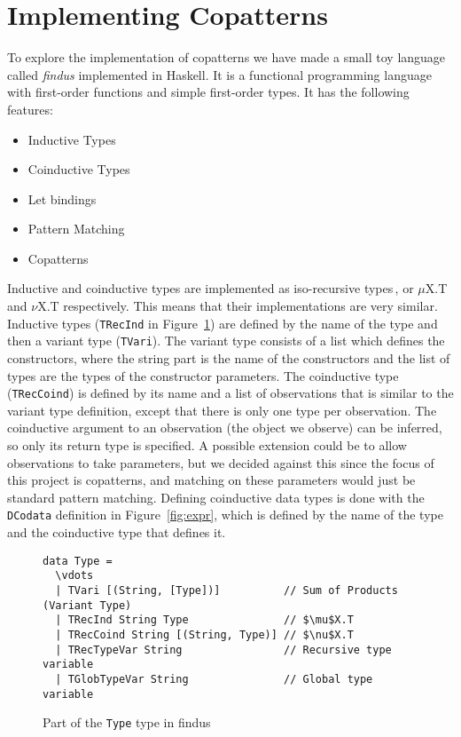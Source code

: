 \section{Implementing Copatterns}
\label{sec:implementing-copatterns}
To explore the implementation of copatterns we have made a small toy language called \textit{findus} implemented in Haskell. It is a functional programming language with first-order functions and simple first-order types. It has the following features:

\begin{itemize}
\item Inductive Types
\item Coinductive Types
\item Let bindings
\item Pattern Matching 
\item Copatterns
\end{itemize}

Inductive and coinductive types are implemented as iso-recursive types\,\cite[Section~20.2]{Pierce:2002:TPL:509043}, or $\mu$X.T and $\nu$X.T respectively. This means that their implementations are very similar. Inductive types (\texttt{TRecInd} in Figure~\ref{fig:types}) are defined by the name of the type and then a variant type (\texttt{TVari}). The variant type consists of a list which defines the constructors, where the string part is the name of the constructors and the list of types are the types of the constructor parameters. The coinductive type (\texttt{TRecCoind}) is defined by its name and a list of observations that is similar to the variant type definition, except that there is only one type per observation. The coinductive argument to an observation (the object we observe) can be inferred, so only its return type is specified. A possible extension could be to allow observations to take parameters, but we decided against this since the focus of this project is copatterns, and matching on these parameters would just be standard pattern matching. Defining coinductive data types is done with the \texttt{DCodata} definition in Figure~\ref{fig:expr}, which is defined by the name of the type and the coinductive type that defines it.

\begin{figure}
\begin{Verbatim}[commandchars=\\\{\},codes={\catcode`$=3\catcode`_=8}]
data Type =
  \vdots
  | TVari [(String, [Type])]          // Sum of Products (Variant Type)
  | TRecInd String Type               // $\mu$X.T
  | TRecCoind String [(String, Type)] // $\nu$X.T
  | TRecTypeVar String                // Recursive type variable
  | TGlobTypeVar String               // Global type variable
\end{Verbatim}
\caption{Part of the \texttt{Type} type in findus}
\label{fig:types}
\end{figure}

